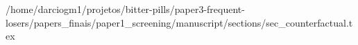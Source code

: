 /home/darciogm1/projetos/bitter-pills/paper3-frequent-losers/papers_finais/paper1_screening/manuscript/sections/sec_counterfactual.tex